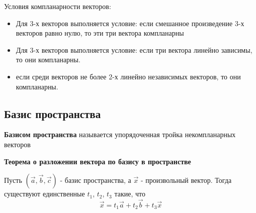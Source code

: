 \documentclass[a4paper]{article}
\begin{document}
    Условия компланарности векторов:\begin{itemize}
                                        \item Для 3-х векторов выполняется условие: если смешанное произведение 3-х векторов равно нулю, то эти три вектора компланарны
                                        \item Для 3-х векторов выполняется условие: если три вектора линейно зависимы, то они компланарны.
                                        \item если среди векторов не более 2-х линейно независимых векторов, то они компланарны.
    \end{itemize}
    \subsection*{Базис пространства}
    \textbf{Базисом пространства }называется упорядоченная тройка некомпланарных
    векторов

    \begin{htheorem}
        \textbf{Теорема о разложении вектора по базису в пространстве}

        Пусть $( \vec{a}, \vec{b}, \vec{c})$ - базис пространства, а $\vec{x}$ - произвольный вектор. Тогда существуют единственные $t_1$, $t_2$, $t_3$ такие, что
        \begin{equation}
            \vec{x} = t_1 \vec{a} + t_2 \vec{b} + t_3 \vec{x}
        \end{equation}
    \end{htheorem}
\end{document}
